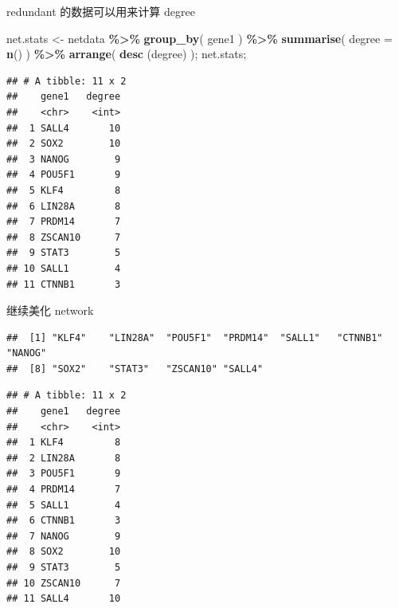 \documentclass[ignorenonframetext,]{beamer}
\newenvironment{Shaded}{\begin{snugshade}}{\end{snugshade}}
\newcommand{\AttributeTok}[1]{\textcolor[rgb]{0.13,0.29,0.53}{#1}}
\newcommand{\DocumentationTok}[1]{\textcolor[rgb]{0.56,0.35,0.01}{\textbf{\textit{#1}}}}
\newcommand{\FunctionTok}[1]{\textcolor[rgb]{0.13,0.29,0.53}{\textbf{#1}}}
\newcommand{\NormalTok}[1]{#1}
\newcommand{\OtherTok}[1]{\textcolor[rgb]{0.56,0.35,0.01}{#1}}
\newcommand{\SpecialCharTok}[1]{\textcolor[rgb]{0.81,0.36,0.00}{\textbf{#1}}}
\newcommand\FontSmall{\fontsize{7}{8}\selectfont}
\begin{document}
\begin{frame}[fragile]{redundant 的数据可以用来计算 degree}
\protect\hypertarget{redundant-ux7684ux6570ux636eux53efux4ee5ux7528ux6765ux8ba1ux7b97-degree}{}
\FontSmall

\begin{Shaded}
\begin{Highlighting}[]
\NormalTok{net.stats }\OtherTok{\textless{}{-}} 
\NormalTok{  netdata }\SpecialCharTok{\%\textgreater{}\%} \FunctionTok{group\_by}\NormalTok{( gene1 ) }\SpecialCharTok{\%\textgreater{}\%} \FunctionTok{summarise}\NormalTok{( }\AttributeTok{degree =} \FunctionTok{n}\NormalTok{() ) }\SpecialCharTok{\%\textgreater{}\%} 
  \FunctionTok{arrange}\NormalTok{( }\FunctionTok{desc}\NormalTok{ (degree) );}
\NormalTok{net.stats;}
\end{Highlighting}
\end{Shaded}

\begin{verbatim}
## # A tibble: 11 x 2
##    gene1   degree
##    <chr>    <int>
##  1 SALL4       10
##  2 SOX2        10
##  3 NANOG        9
##  4 POU5F1       9
##  5 KLF4         8
##  6 LIN28A       8
##  7 PRDM14       7
##  8 ZSCAN10      7
##  9 STAT3        5
## 10 SALL1        4
## 11 CTNNB1       3
\end{verbatim}
\end{frame}

\begin{frame}[fragile]{继续美化 network}
\protect\hypertarget{ux7ee7ux7eedux7f8eux5316-network}{}
\FontSmall

\begin{Shaded}
\end{Shaded}

\begin{verbatim}
##  [1] "KLF4"    "LIN28A"  "POU5F1"  "PRDM14"  "SALL1"   "CTNNB1"  "NANOG"  
##  [8] "SOX2"    "STAT3"   "ZSCAN10" "SALL4"
\end{verbatim}

\begin{Shaded}
\end{Shaded}

\begin{verbatim}
## # A tibble: 11 x 2
##    gene1   degree
##    <chr>    <int>
##  1 KLF4         8
##  2 LIN28A       8
##  3 POU5F1       9
##  4 PRDM14       7
##  5 SALL1        4
##  6 CTNNB1       3
##  7 NANOG        9
##  8 SOX2        10
##  9 STAT3        5
## 10 ZSCAN10      7
## 11 SALL4       10
\end{verbatim}
\end{frame}
\end{document}
